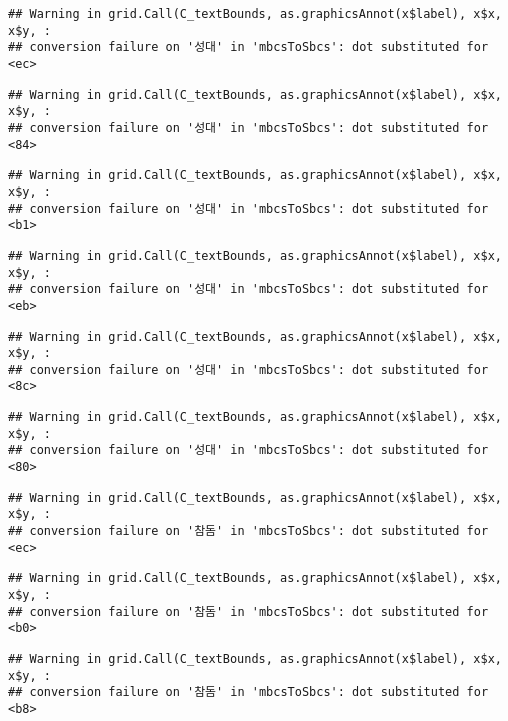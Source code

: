 \documentclass[
]{article}
\begin{document}
\begin{verbatim}
## Warning in grid.Call(C_textBounds, as.graphicsAnnot(x$label), x$x, x$y, :
## conversion failure on '성대' in 'mbcsToSbcs': dot substituted for <ec>
\end{verbatim}

\begin{verbatim}
## Warning in grid.Call(C_textBounds, as.graphicsAnnot(x$label), x$x, x$y, :
## conversion failure on '성대' in 'mbcsToSbcs': dot substituted for <84>
\end{verbatim}

\begin{verbatim}
## Warning in grid.Call(C_textBounds, as.graphicsAnnot(x$label), x$x, x$y, :
## conversion failure on '성대' in 'mbcsToSbcs': dot substituted for <b1>
\end{verbatim}

\begin{verbatim}
## Warning in grid.Call(C_textBounds, as.graphicsAnnot(x$label), x$x, x$y, :
## conversion failure on '성대' in 'mbcsToSbcs': dot substituted for <eb>
\end{verbatim}

\begin{verbatim}
## Warning in grid.Call(C_textBounds, as.graphicsAnnot(x$label), x$x, x$y, :
## conversion failure on '성대' in 'mbcsToSbcs': dot substituted for <8c>
\end{verbatim}

\begin{verbatim}
## Warning in grid.Call(C_textBounds, as.graphicsAnnot(x$label), x$x, x$y, :
## conversion failure on '성대' in 'mbcsToSbcs': dot substituted for <80>
\end{verbatim}

\begin{verbatim}
## Warning in grid.Call(C_textBounds, as.graphicsAnnot(x$label), x$x, x$y, :
## conversion failure on '참돔' in 'mbcsToSbcs': dot substituted for <ec>
\end{verbatim}

\begin{verbatim}
## Warning in grid.Call(C_textBounds, as.graphicsAnnot(x$label), x$x, x$y, :
## conversion failure on '참돔' in 'mbcsToSbcs': dot substituted for <b0>
\end{verbatim}

\begin{verbatim}
## Warning in grid.Call(C_textBounds, as.graphicsAnnot(x$label), x$x, x$y, :
## conversion failure on '참돔' in 'mbcsToSbcs': dot substituted for <b8>
\end{verbatim}
\end{document}
